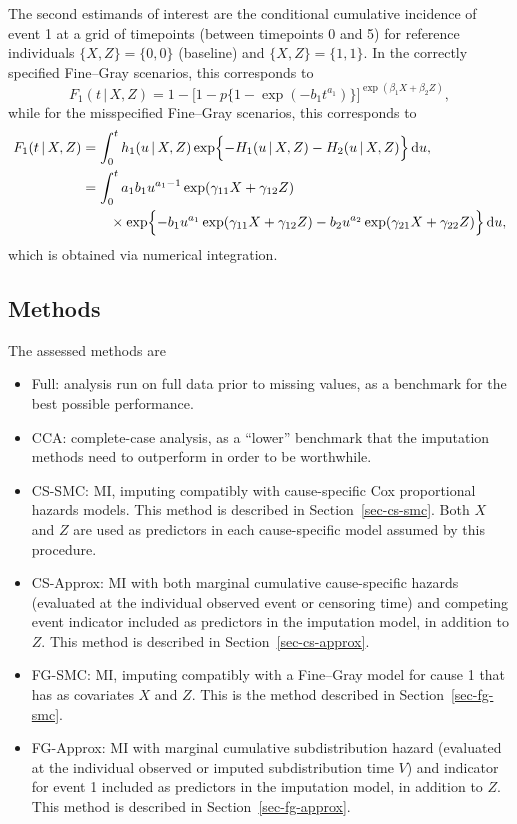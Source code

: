 \documentclass[
  letterpaper,
  DIV=11,
  numbers=noendperiod]{scrreprt}
\providecommand{\tightlist}{%
  \setlength{\itemsep}{0pt}\setlength{\parskip}{0pt}}\usepackage{longtable,booktabs,array}
\newcommand{\given}{\,|\,}
\newcommand\diff{\mathop{}\!\mathrm{d}}
\begin{document}
The second estimands of interest are the conditional cumulative
incidence of event 1 at a grid of timepoints (between timepoints 0 and
5) for reference individuals \(\{X, Z\} = \{0,0\}\) (baseline) and
\(\{X, Z\} = \{1,1\}\). In the correctly specified Fine--Gray scenarios,
this corresponds to \begin{equation*}
    F_1(t \given X, Z) = 1 - \big[1-p\{1- \exp(-b_1t^{a_1})\}\big]^{\exp(\beta_{1}X + \beta_{2}Z)},
\end{equation*} while for the misspecified Fine--Gray scenarios, this
corresponds to \begin{align*}
    F_1(t \given X, Z) &= \int_{0}^{t}h_1(u \given X, Z) \exp\Bigl\{{ - H_1(u \given X, Z) - H_2(u \given X, Z) \Bigr\}}\diff u, \\
    &= \int_{0}^{t} a_1b_1u^{a_1 - 1}\exp(\gamma_{11}X + \gamma_{12}Z) \\
    &\qquad \times  \exp\Bigl\{{ -b_1u^{a_1}\exp(\gamma_{11}X + \gamma_{12}Z) - b_2u^{a_2}\exp(\gamma_{21}X + \gamma_{22}Z) \Bigr\}}\diff u,
\end{align*} which is obtained via numerical integration.

\subsection{Methods}\label{methods-1}

The assessed methods are

\begin{itemize}
\tightlist
\item
  Full: analysis run on full data prior to missing values, as a
  benchmark for the best possible performance.
\item
  CCA: complete-case analysis, as a ``lower'' benchmark that the
  imputation methods need to outperform in order to be worthwhile.
\item
  CS-SMC: MI, imputing compatibly with cause-specific Cox proportional
  hazards models. This method is described in Section~\ref{sec-cs-smc}.
  Both \(X\) and \(Z\) are used as predictors in each cause-specific
  model assumed by this procedure.
\item
  CS-Approx: MI with both marginal cumulative cause-specific hazards
  (evaluated at the individual observed event or censoring time) and
  competing event indicator included as predictors in the imputation
  model, in addition to \(Z\). This method is described in
  Section~\ref{sec-cs-approx}.
\item
  FG-SMC: MI, imputing compatibly with a Fine--Gray model for cause 1
  that has as covariates \(X\) and \(Z\). This is the method described
  in Section~\ref{sec-fg-smc}.
\item
  FG-Approx: MI with marginal cumulative subdistribution hazard
  (evaluated at the individual observed or imputed subdistribution time
  \(V\)) and indicator for event 1 included as predictors in the
  imputation model, in addition to \(Z\). This method is described in
  Section~\ref{sec-fg-approx}.
\end{itemize}
\end{document}
